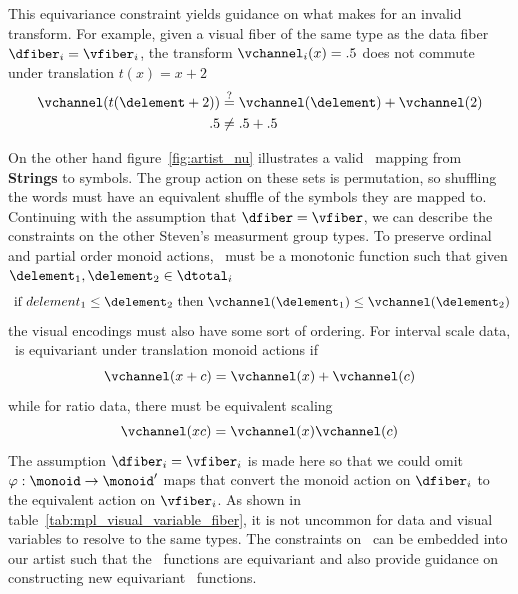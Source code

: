 \documentclass[../main.tex]{subfiles}
\begin{document}
This equivariance constraint yields guidance on what makes for an invalid transform. For example, given a visual fiber of the same type as the data fiber $\dfiber_i=\vfiber_i$, the transform $\vchannel_{i}(x) = .5$ does not commute under translation $t(x) = x+2$  
\begin{align}
    \vchannel(t(\delement + 2)) & \overset{?}{=} \vchannel(\delement) + \vchannel(2)\\
    .5 &\neq .5 + .5
\end{align}

On the other hand figure~\ref{fig:artist_nu} illustrates a valid \vchannel\ mapping from \textbf{Strings} to symbols. The group action on these sets is permutation, so shuffling the words must have an equivalent shuffle of the symbols they are mapped to. Continuing with the assumption that $\dfiber=\vfiber$, we can describe the constraints on the other Steven's measurment group types. To preserve ordinal and partial order monoid actions, \vchannel\ must be a monotonic function such that given $\delement_1, \delement_2 \in \dtotal_{i}$ 
\begin{equation}
\text{ if } delement_1 \leq \delement_2 \text{ then } \vchannel (\delement_1) \leq \vchannel(\delement_2)
\end{equation}
the visual encodings must also have some sort of ordering. For interval scale data, \vchannel\ is equivariant under translation monoid actions if 
\begin{equation}
\vchannel (x + c) = \vchannel(x) + \vchannel(c)
\end{equation}
while for ratio data, there must be equivalent scaling 
\begin{equation}
\vchannel(xc) = \vchannel(x)\vchannel(c) 
\end{equation}
The assumption $\dfiber_i=\vfiber_i$ is made here so that we could omit  $\varphi: \monoid\rightarrow\monoid^{\prime}$ maps that convert the monoid action on $\dfiber_{i}$ to the equivalent action on $\vfiber_{i}$. As shown in table~\ref{tab:mpl_visual_variable_fiber}, it is not uncommon for data and visual variables to resolve to the same types. The constraints on \vchannel\ can be embedded into our artist such that the \vchannel\ functions are equivariant and also provide guidance on constructing new equivariant \vchannel\ functions. 
\end{document}
